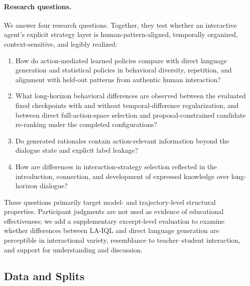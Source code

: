 \documentclass[manuscript,review,anonymous]{acmart}
\begin{document}
\paragraph{Research questions.}
We answer four research questions. Together, they test whether an interactive
agent's explicit strategy layer is human-pattern-aligned, temporally organized,
context-sensitive, and legibly realized:
\begin{enumerate}[label=\textbf{RQ\arabic*:},leftmargin=*,itemsep=2pt,topsep=2pt,parsep=0pt]
\item How do action-mediated learned policies compare with direct
language generation and statistical policies in behavioral diversity,
repetition, and alignment with held-out patterns from authentic human
interaction?
\item What long-horizon behavioral differences are observed between
the evaluated fixed checkpoints with and without temporal-difference
regularization, and between direct full-action-space selection and
proposal-constrained candidate re-ranking under the completed configurations?
\item Do generated rationales contain action-relevant information beyond the
dialogue state and explicit label leakage?
\item How are differences in interaction-strategy selection reflected in the
introduction, connection, and development of expressed knowledge over
long-horizon dialogue?
\end{enumerate}

These questions primarily target model- and trajectory-level structural
properties. Participant judgments are not used as evidence of educational
effectiveness; we add a supplementary excerpt-level evaluation to examine
whether differences between LA-IQL and direct language generation are
perceptible in interactional variety, resemblance to teacher--student
interaction, and support for understanding and discussion.

\subsection{Data and Splits}
\end{document}
